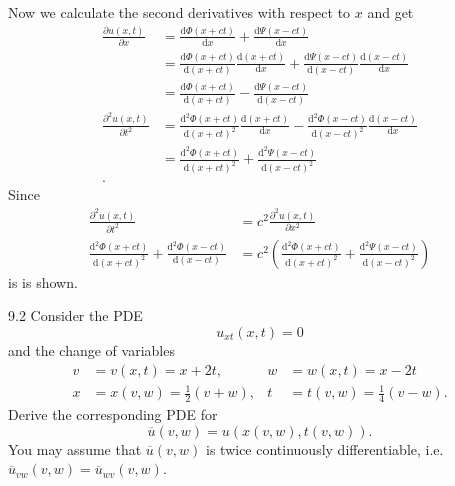 \begin{derivation}
  Now we calculate the second derivatives with respect to $x$ and get
  \begin{align*}
    \frac{\partial u(x,t)}{\partial x} &= \frac{\mathrm{d} \Phi(x+ct)}{\mathrm{d} x} + \frac{\mathrm{d} \Psi(x-ct)}{\mathrm{d} x}  \\
    &= \frac{\mathrm{d}\Phi(x+ct)}{\mathrm{d}(x + ct)} \frac{\mathrm{d}(x+ct)}{\mathrm{d}x} + \frac{\mathrm{d}\Psi(x-ct)}{\mathrm{d}(x-ct)} \frac{\mathrm{d}(x-ct)}{\mathrm{d}x}   \\
    &= \frac{\mathrm{d}\Phi(x+ct)}{\mathrm{d}(x+ct)} - \frac{\mathrm{d}\Psi(x-ct)}{\mathrm{d}(x-ct)} \\
    \frac{\partial^2 u(x,t)}{\partial t^2} &= \frac{\mathrm{d}^2\Phi(x+ct)}{\mathrm{d}(x+ct)^2} \frac{\mathrm{d}(x+ct)}{\mathrm{d}x} - \frac{\mathrm{d}^2\Phi(x-ct)}{\mathrm{d}(x-ct)^2} \frac{\mathrm{d}(x-ct)}{\mathrm{d}x} \\
    &= \frac{\mathrm{d}^2 \Phi(x+ct)}{\mathrm{d}(x+ct)^2} + \frac{\mathrm{d}^2 \Psi(x-ct)}{\mathrm{d}(x-ct)^2} \\
  .\end{align*}
  Since
  \begin{align*}
    \frac{\partial^2 u(x,t)}{\partial t^2} &= c^2 \frac{\partial^2 u(x,t)}{\partial x^2}  \\
    \frac{\mathrm{d}^2 \Phi(x+ct)}{\mathrm{d}(x+ct)^2} + \frac{\mathrm{d}^2\Phi(x-ct)}{\mathrm{d}(x-ct)} &= c^2 \left( \frac{\mathrm{d}^2 \Phi(x+ct)}{\mathrm{d}(x+ct)^2} + \frac{\mathrm{d}^2 \Psi(x-ct)}{\mathrm{d}(x-ct)^2}   \right)  
  \end{align*}
  is is shown.
\end{derivation}

\newpage

\begin{problem}{9.2}
  Consider the PDE
  \[ 
  u_{xt}(x,t) = 0
  \]
  and the change of variables
  \begin{align*}
    v &= v(x,t) = x + 2t, & w &= w(x,t) = x - 2t \\
    x &= x(v,w) = \frac{1}{2}(v+w), & t &= t(v,w) = \frac{1}{4}(v-w)
  .\end{align*}
  Derive the corresponding PDE for
  \[ 
  \overline{u}(v,w) = u (x(v,w), t(v,w))
  .\]
  You may assume that $\overline{u}(v,w)$ is twice continuously differentiable, i.e. $\overline{u}_{vw}(v,w) = \overline{u}_{wv}(v, w)$.
\end{problem}

